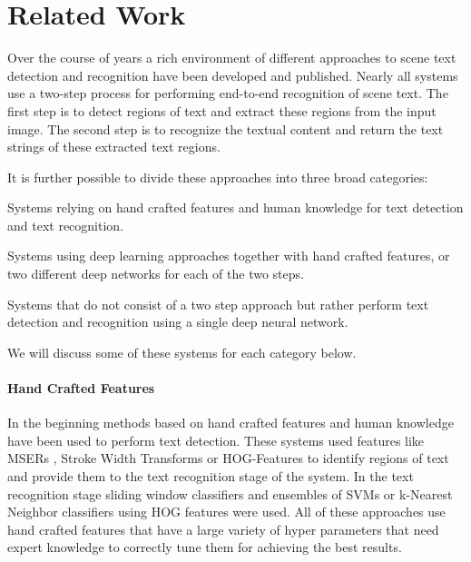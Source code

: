 \documentclass[10pt,twocolumn,letterpaper]{article}
\begin{document}
 
	\section{Related Work}
\label{sec:related_work}

Over the course of years a rich environment of different approaches to scene text detection and recognition have been developed and published.
Nearly all systems use a two-step process for performing end-to-end recognition of scene text.
The first step is to detect regions of text and extract these regions from the input image.
The second step is to recognize the textual content and return the text strings of these extracted text regions.


It is further possible to divide these approaches into three broad categories:
\begin{enumerate*}[label={(\arabic*)}]
	\item Systems relying on hand crafted features and human knowledge for text detection and text recognition.
	\item Systems using deep learning approaches together with hand crafted features, or two different deep networks for each of the two steps.
	\item Systems that do not consist of a two step approach but rather perform text detection and recognition using a single deep neural network.
\end{enumerate*}
We will discuss some of these systems for each category below.

\paragraph{Hand Crafted Features}
	In the beginning methods based on hand crafted features and human knowledge have been used to perform text detection.
	These systems used features like MSERs \cite{Neumann2010Method}, Stroke Width Transforms \cite{Epshtein2010Detecting} or HOG-Features \cite{Wang2011EndToEnd} to identify regions of text and provide them to the text recognition stage of the system.
	In the text recognition stage sliding window classifiers \cite{Mishra2012Scene} and ensembles of SVMs \cite{Yao2014Strokelets} or k-Nearest Neighbor classifiers using HOG features \cite{Wang2010Word} were used.
	All of these approaches use hand crafted features that have a large variety of hyper parameters that need expert knowledge to correctly tune them for achieving the best results.
\end{document}
